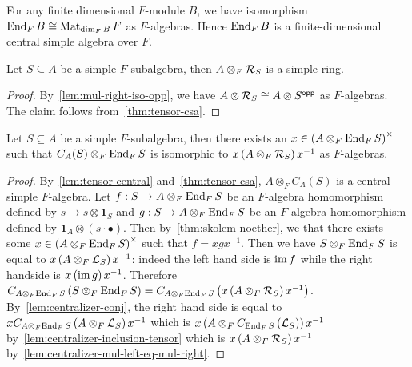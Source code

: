  \begin{remark}
   For any finite dimensional $F$-module $B$, we have isomorphism
   $\operatorname{End}_{F}B \cong \operatorname{Mat}_{\dim_{F}B}F$ as $F$-algebras. Hence $\operatorname{End}_{F} B$ is a
   finite-dimensional central simple algebra over $F$.
 \end{remark}

 \begin{lemma}\label{lem:tensor-mul-right-simple}
   Let $S\subseteq A$ be a simple $F$-subalgebra, then
   $A \otimes_{F} \mathcal{R}_{S}$ is a simple ring. \leanok
 \end{lemma}

 \begin{proof}
   By~\cref{lem:mul-right-iso-opp}, we have
   $A\otimes \mathcal{R}_{S}\cong A\otimes S^{\mathsf{opp}}$ as $F$-algebras. The claim follows
   from~\cref{thm:tensor-csa}.
 \end{proof}

 \begin{lemma}\label{lem:centralizer-tensor-end-eq-conj-tensor-mul-right}
   Let $S\subseteq A$ be a simple $F$-subalgebra, then there
   exists an $x\in \left(A\otimes_{F}\operatorname{End}_{F}S\right)^{\times}$ such that
   $C_{A}(S)\otimes_{F}\operatorname{End}_{F}S$ is isomorphic to
   $x\left(A\otimes_{F}\mathcal{R}_{S}\right)x^{-1}$ as $F$-algebras. \leanok
 \end{lemma}

 \begin{proof}
   By~\cref{lem:tensor-central} and~\cref{thm:tensor-csa},
   $A \otimes_{F}C_{A}(S)$ is a central simple $F$-algebra. Let
   $f : S \to A\otimes_{F}\operatorname{End}_{F}S$ be an $F$-algebra homomorphism defined by
   $s \mapsto s \otimes \mathbf{1}_{S}$ and $g : S \to A \otimes_{F}\operatorname{End}_{F}S$
   be an $F$-algebra homomorphism defined by
   $\mathbf{1}_{A} \otimes \left(s\cdot\bullet\right)$. Then
   by~\cref{thm:skolem-noether}, we that there exists some
   $x\in \left(A\otimes_{F}\operatorname{End}_{F}S\right)^{\times}$ such that $f = xgx^{-1}$.
   Then we have $S\otimes_{F}\operatorname{End}_{F}S$ is equal to
   $x\left(A\otimes_{F}\mathcal{L}_{S}\right)x^{-1}$: indeed the left hand side is
   $\operatorname{im} f$ while the right handside is $x\left(\operatorname{im} g\right)x^{-1}$. Therefore
   $C_{A\otimes_{F}\operatorname{End}_{F}S}\left(S\otimes_{F}\operatorname{End}_{F}S\right) = C_{A\otimes_{F}\operatorname{End}_{F}S}\left(x\left(A\otimes_{F}\mathcal{R}_{S}\right)x^{-1}\right)$.
   By~\cref{lem:centralizer-conj}, the right hand side is equal to
   $xC_{A\otimes_{F}\operatorname{End}_{F}S}\left(A\otimes_{F}\mathcal{L}_{S}\right)x^{-1}$ which is
   $x\left(A\otimes_{F}C_{\operatorname{End}_{F}S}\left(\mathcal{L}_{S}\right)\right)x^{-1}$
   by~\cref{lem:centralizer-inclusion-tensor} which is
   $x\left(A\otimes_{F}\mathcal{R}_{S}\right)x^{-1}$
   by~\cref{lem:centralizer-mul-left-eq-mul-right}.
 \end{proof}

